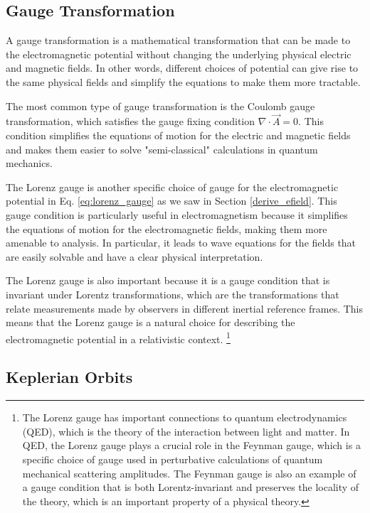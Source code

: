 \documentclass[10pt]{article}
\begin{document}
\subsection{Gauge Transformation}
\label{appen_gauges}

A gauge transformation is a mathematical transformation that can be made to the electromagnetic potential without changing the underlying physical electric and magnetic fields. In other words, different choices of potential can give rise to the same physical fields and simplify the equations to make them more tractable.

The most common type of gauge transformation is the Coulomb gauge transformation, which satisfies the gauge fixing condition $\nabla \cdot \vec{A} = 0$. This condition simplifies the equations of motion for the electric and magnetic fields and makes them easier to solve "semi-classical" calculations in quantum mechanics.

The Lorenz gauge is another specific choice of gauge for the electromagnetic potential in Eq. \ref{eq:lorenz_gauge} as we saw in Section \ref{derive_efield}. This gauge condition is particularly useful in electromagnetism because it simplifies the equations of motion for the electromagnetic fields, making them more amenable to analysis. In particular, it leads to wave equations for the fields that are easily solvable and have a clear physical interpretation.

The Lorenz gauge is also important because it is a gauge condition that is invariant under Lorentz transformations, which are the transformations that relate measurements made by observers in different inertial reference frames. This means that the Lorenz gauge is a natural choice for describing the electromagnetic potential in a relativistic context. \footnote{The Lorenz gauge has important connections to quantum electrodynamics (QED), which is the theory of the interaction between light and matter. In QED, the Lorenz gauge plays a crucial role in the Feynman gauge, which is a specific choice of gauge used in perturbative calculations of quantum mechanical scattering amplitudes. The Feynman gauge is also an example of a gauge condition that is both Lorentz-invariant and preserves the locality of the theory, which is an important property of a physical theory.}

\subsection{Keplerian Orbits}
\label{appen_orbit}
\end{document}
